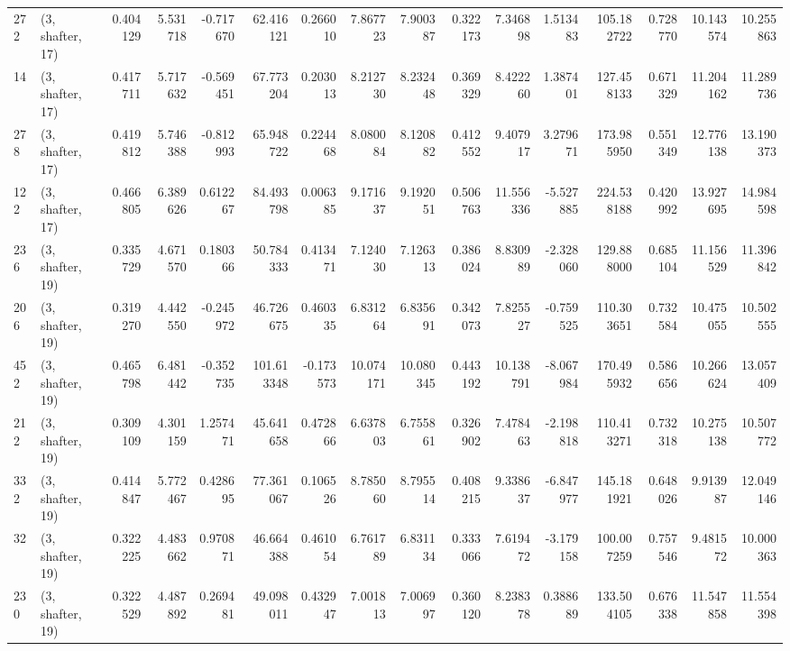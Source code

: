 \begin{tabular}{llrrrrrrrrrrrrrr}
272 &  (3, shafter, 17) &   0.404129 &   5.531718 &  -0.717670 &    62.416121 &   0.266010 &   7.867723 &   7.900387 &  0.322173 &   7.346898 &   1.513483 &   105.182722 &  0.728770 &  10.143574 &  10.255863 \\
14  &  (3, shafter, 17) &   0.417711 &   5.717632 &  -0.569451 &    67.773204 &   0.203013 &   8.212730 &   8.232448 &  0.369329 &   8.422260 &   1.387401 &   127.458133 &  0.671329 &  11.204162 &  11.289736 \\
278 &  (3, shafter, 17) &   0.419812 &   5.746388 &  -0.812993 &    65.948722 &   0.224468 &   8.080084 &   8.120882 &  0.412552 &   9.407917 &   3.279671 &   173.985950 &  0.551349 &  12.776138 &  13.190373 \\
122 &  (3, shafter, 17) &   0.466805 &   6.389626 &   0.612267 &    84.493798 &   0.006385 &   9.171637 &   9.192051 &  0.506763 &  11.556336 &  -5.527885 &   224.538188 &  0.420992 &  13.927695 &  14.984598 \\
236 &  (3, shafter, 19) &   0.335729 &   4.671570 &   0.180366 &    50.784333 &   0.413471 &   7.124030 &   7.126313 &  0.386024 &   8.830989 &  -2.328060 &   129.888000 &  0.685104 &  11.156529 &  11.396842 \\
206 &  (3, shafter, 19) &   0.319270 &   4.442550 &  -0.245972 &    46.726675 &   0.460335 &   6.831264 &   6.835691 &  0.342073 &   7.825527 &  -0.759525 &   110.303651 &  0.732584 &  10.475055 &  10.502555 \\
452 &  (3, shafter, 19) &   0.465798 &   6.481442 &  -0.352735 &   101.613348 &  -0.173573 &  10.074171 &  10.080345 &  0.443192 &  10.138791 &  -8.067984 &   170.495932 &  0.586656 &  10.266624 &  13.057409 \\
212 &  (3, shafter, 19) &   0.309109 &   4.301159 &   1.257471 &    45.641658 &   0.472866 &   6.637803 &   6.755861 &  0.326902 &   7.478463 &  -2.198818 &   110.413271 &  0.732318 &  10.275138 &  10.507772 \\
332 &  (3, shafter, 19) &   0.414847 &   5.772467 &   0.428695 &    77.361067 &   0.106526 &   8.785060 &   8.795514 &  0.408215 &   9.338637 &  -6.847977 &   145.181921 &  0.648026 &   9.913987 &  12.049146 \\
32  &  (3, shafter, 19) &   0.322225 &   4.483662 &   0.970871 &    46.664388 &   0.461054 &   6.761789 &   6.831134 &  0.333066 &   7.619472 &  -3.179158 &   100.007259 &  0.757546 &   9.481572 &  10.000363 \\
230 &  (3, shafter, 19) &   0.322529 &   4.487892 &   0.269481 &    49.098011 &   0.432947 &   7.001813 &   7.006997 &  0.360120 &   8.238378 &   0.388689 &   133.504105 &  0.676338 &  11.547858 &  11.554398 \\

\end{tabular}
